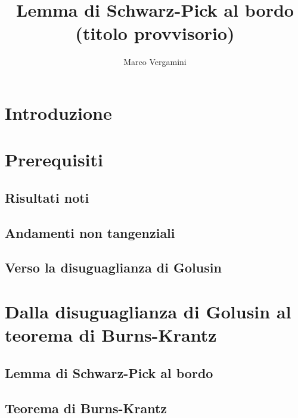 \documentclass{article}
\title{Lemma di Schwarz-Pick al bordo (titolo provvisorio)}
\date{}
\author{Marco Vergamini}
\begin{document}
\maketitle
\newpage
\tableofcontents
\newpage


\section*{Introduzione}


\newpage

\section{Prerequisiti}

\subsection{Risultati noti}


\subsection{Andamenti non tangenziali}


\subsection{Verso la disuguaglianza di Golusin}


\newpage

\section{Dalla disuguaglianza di Golusin al teorema di Burns-Krantz}

\subsection{Lemma di Schwarz-Pick al bordo}


\subsection{Teorema di Burns-Krantz}


\newpage


\end{document}
